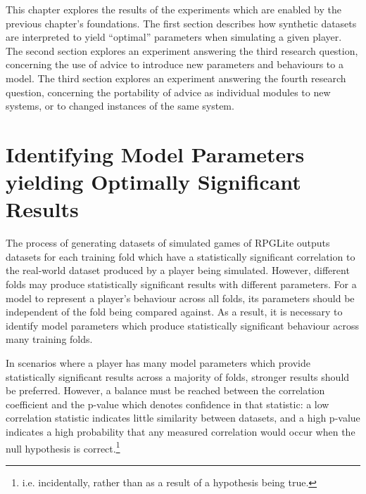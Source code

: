 This chapter explores the results of the experiments which are enabled by the
previous chapter's foundations.
The first section describes how synthetic datasets are interpreted to yield
``optimal'' parameters when simulating a given player.
The second section explores an experiment answering the third research question,
concerning the use of advice to introduce new parameters and behaviours to a model.
The third section explores an experiment answering the fourth research question,
concerning the portability of advice as individual modules to new systems, or to
changed instances of the same system.



\section{Identifying Model Parameters yielding Optimally Significant Results}
\label{identifying-significant-results-explanation}



The process of generating datasets of simulated games of RPGLite outputs
datasets for each training fold which have a statistically significant
correlation to the real-world dataset produced by a player being simulated.
However, different folds may produce statistically significant results with
different parameters. For a model to represent a player's behaviour across all
folds, its parameters should be independent of the fold being compared against.
As a result, it is necessary to identify model parameters which produce
statistically significant behaviour across many training folds.

In scenarios where a player has many model parameters which provide
statistically significant results across a majority of folds, stronger results
should be preferred. However, a balance must be reached between the \tau{}
correlation coefficient and the p-value which denotes confidence in that
statistic: a low correlation statistic indicates little similarity between
datasets, and a high p-value indicates a high probability that any measured
correlation would occur when the null hypothesis is correct.\footnote{i.e. incidentally,
rather than as a result of a hypothesis being true.}

